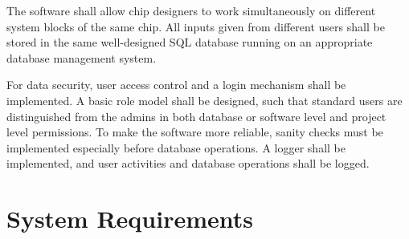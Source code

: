 The software shall allow chip designers to work simultaneously on different system blocks of the same chip. All inputs given from different users shall be stored in the same well-designed SQL database running on an appropriate database management system.

For data security, user access control and a login mechanism shall be implemented. A basic role model shall be designed, such that standard users are distinguished from the admins in both database or software level and project level permissions. To make the software more reliable, sanity checks must be implemented especially before database operations. A logger shall be implemented, and user activities and database operations shall be logged.

\section{System Requirements}
